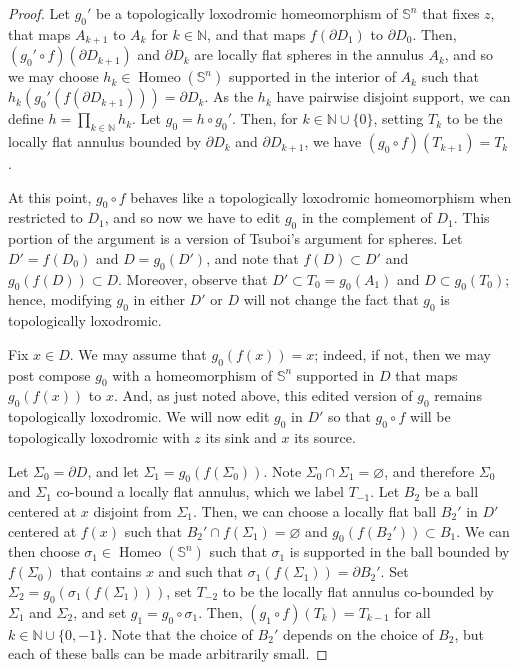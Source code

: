 \documentclass[microtype]{gtpart}
\newcommand{\bn}{\mathbb N}
\DeclareMathOperator{\Homeo}{Homeo}
\theoremstyle{definition}
\numberwithin{equation}{section}
\begin{document}
\begin{proof}
Let \( g_0' \) be a topologically loxodromic homeomorphism of \( \mathbb S^n \) that fixes \( z \), that maps \( A_{k+1} \) to \( A_{k} \) for \( k \in \bn \), and that maps \( f(\partial D_1) \) to \( \partial D_0 \). 
Then, \( (g_0'\circ f)(\partial D_{k+1}) \) and \( \partial D_{k} \) are locally flat spheres in the annulus \( A_k \), and so we may choose  \( h_k \in \Homeo( \mathbb S^n ) \) supported in the interior of \( A_{k} \) such that \( h_k(g_0'(f(\partial D_{k+1}))) = \partial D_{k} \). 
As the \( h_k \) have pairwise disjoint support, we can define \( h = \prod_{k\in\bn} h_k \). 
Let \( g_0 = h \circ g_0' \). 
Then, for \( k \in \bn\cup\{0\} \), setting \( T_{k} \) to be the locally flat  annulus bounded by \( \partial D_{k} \) and \( \partial D_{k+1} \), we have \( (g_0\circ f)(T_{k+1}) = T_{k} \). 

At this point, \( g_0 \circ f \) behaves like a topologically loxodromic homeomorphism when restricted to \( D_1 \), and so now we have to edit \( g_0 \) in the complement of \( D_1 \). 
This portion of the argument is a version of Tsuboi's argument for spheres. 
Let \( D' = f(D_0) \) and \( D = g_0(D') \), and note that \( f(D) \subset D' \) and \( g_0(f(D)) \subset D \). 
Moreover, observe that \( D' \subset T_0 = g_0(A_1) \) and \( D \subset g_0(T_0) \); hence, modifying \( g_0 \) in either \( D' \) or \( D \) will not change the fact that \( g_0 \) is topologically loxodromic. 

Fix \( x \in D \).
We may assume that \( g_0(f(x)) = x \); indeed, if not, then we may post compose \( g_0 \) with a homeomorphism of \( \mathbb S^n \) supported in \( D \) that maps \( g_0(f(x)) \) to \( x \). 
And, as just noted above, this edited version of \( g_0 \) remains topologically loxodromic. 
We will now edit \( g_0 \)  in \( D' \) so that \( g_0 \circ f \) will be topologically loxodromic with \( z \) its sink and \( x \) its source.

Let \( \Sigma_0 = \partial D \), and let \( \Sigma_1 = g_0(f(\Sigma_0)) \).
Note \( \Sigma_0 \cap \Sigma_1 = \varnothing \), and therefore \( \Sigma_0 \) and \( \Sigma_1 \) co-bound a locally flat  annulus, which we label \( T_{-1} \). 
Let \( B_2 \) be a ball centered at \( x \) disjoint from \( \Sigma_1 \).
Then, we can choose a locally flat ball \( B_2' \) in \( D' \) centered at \( f(x) \) such that \( B_2' \cap f(\Sigma_1) = \varnothing \) and  \( g_0(f(B_2')) \subset B_1 \). 
We can then choose \( \sigma_1 \in \Homeo(\mathbb S^n) \) such that \( \sigma_1 \) is supported in the ball bounded by \( f(\Sigma_0) \) that contains \( x \) and such that \( \sigma_1(f(\Sigma_1)) = \partial B_2' \). 
Set \( \Sigma_2 = g_0(\sigma_1(f(\Sigma_1))) \), set \( T_{-2} \) to be the  locally flat annulus co-bounded by \( \Sigma_1 \) and \( \Sigma_2 \), and set  \( g_1 = g_0 \circ \sigma_1 \).
Then, \( (g_1\circ f)(T_k) = T_{k-1} \) for all \( k \in \bn \cup \{0, -1\} \). 
Note that the choice of \( B_2' \) depends on the choice of \( B_2 \), but each of these balls can be made arbitrarily small.


\end{proof}
\end{document}

